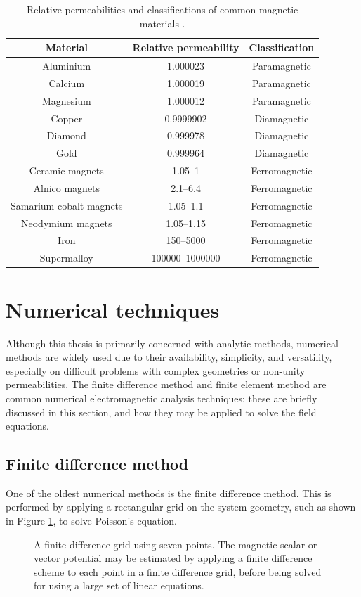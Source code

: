 \begin{table}
    \centering
    \caption{Relative permeabilities and classifications of common magnetic materials \cite{Furlani2001,Jiles2015,Giancoli2000}.}
    \label{tab:permeabilityClassificationTable}
    \begin{tabular}{c|c|c}
         Material & Relative permeability & Classification \\ \hline
         Aluminium & 1.000023 & Paramagnetic \\
         Calcium & 1.000019 & Paramagnetic \\
         Magnesium & 1.000012 & Paramagnetic \\
         Copper & 0.9999902 & Diamagnetic \\
         Diamond & 0.999978 & Diamagnetic \\
         Gold & 0.999964 & Diamagnetic \\
         Ceramic magnets & 1.05--1 & Ferromagnetic \\
         Alnico magnets & 2.1--6.4 & Ferromagnetic \\
         Samarium cobalt magnets & 1.05--1.1 & Ferromagnetic \\
         Neodymium magnets & 1.05--1.15 & Ferromagnetic \\
         Iron & 150--5000 & Ferromagnetic \\
         Supermalloy & 100000--1000000 & Ferromagnetic
    \end{tabular}
\end{table}

\section{Numerical techniques}\label{sec:numericalTechniques}
Although this thesis is primarily concerned with analytic methods, numerical methods are widely used due to their availability, simplicity, and versatility, especially on difficult problems with complex geometries or non-unity permeabilities. The finite difference method and finite element method are common numerical electromagnetic analysis techniques; these are briefly discussed in this section, and how they may be applied to solve the field equations.

\subsection{Finite difference method}\label{sec:finiteDifferenceMethod}
One of the oldest numerical methods is the finite difference method. This is performed by applying a rectangular grid on the system geometry, such as shown in Figure \ref{fig:FDMgrid}, to solve Poisson's equation.
\begin{figure}
    \centering
    
    \caption{A finite difference grid using seven points. The magnetic scalar or vector potential may be estimated by applying a finite difference scheme to each point in a finite difference grid, before being solved for using a large set of linear equations.}
    \label{fig:FDMgrid}
\end{figure}

